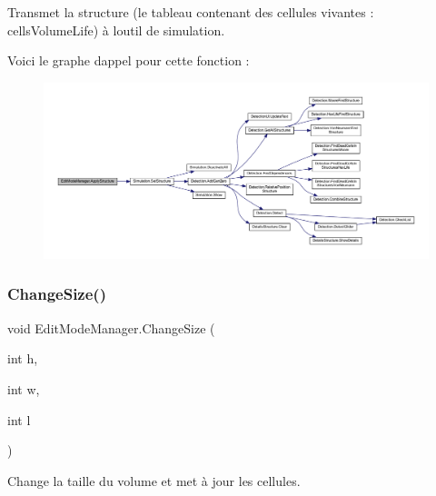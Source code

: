 Transmet la structure (le tableau contenant des cellules vivantes \+: cells\+Volume\+Life) à l\textquotesingle{}outil de simulation. 

Voici le graphe d\textquotesingle{}appel pour cette fonction \+:
\nopagebreak
\begin{figure}[H]
\begin{center}
\leavevmode
\includegraphics[width=350pt]{class_edit_mode_manager_ac1d4e4f292d17b4364054f05ddc13bee_cgraph}
\end{center}
\end{figure}
\mbox{\label{class_edit_mode_manager_acab9d2ee3853d18b73e82135d800c341}} 
\subsubsection{\texorpdfstring{Change\+Size()}{ChangeSize()}}
{\footnotesize\ttfamily void Edit\+Mode\+Manager.\+Change\+Size (\begin{DoxyParamCaption}\item[{int}]{h,  }\item[{int}]{w,  }\item[{int}]{l }\end{DoxyParamCaption})\hspace{0.3cm}{\ttfamily [inline]}}



Change la taille du volume et met à jour les cellules. 


